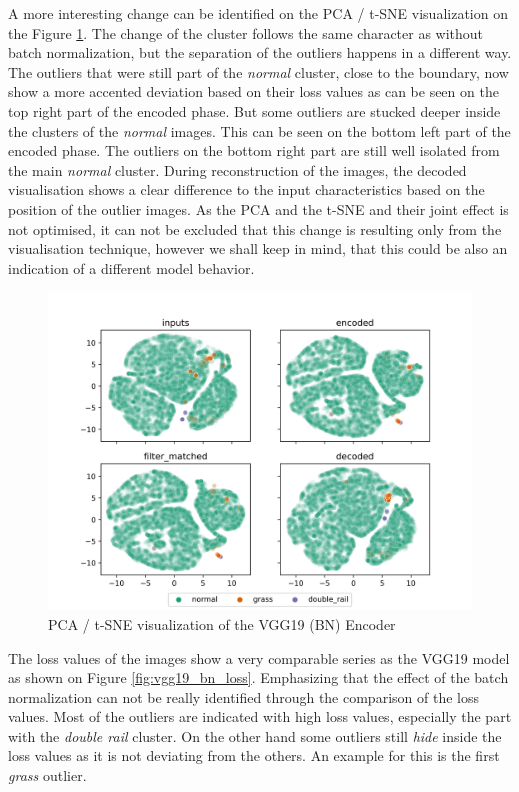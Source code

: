 A more interesting change can be identified on the PCA / t-SNE visualization on the
Figure \ref{fig:vgg19_bn_pca}.
The change of the cluster follows the same character as without batch normalization, but the separation
of the outliers happens in a different way.
The outliers that were still part of the \emph{normal} cluster, close to the boundary, now show a more
accented deviation based on their loss values as can be seen on the top right part of the encoded phase.
But some outliers are stucked deeper inside the clusters of the \emph{normal} images.
This can be seen on the bottom left part of the encoded phase.
The outliers on the bottom right part are still well isolated from the main \emph{normal} cluster.
During reconstruction of the images, the decoded visualisation shows a clear difference to the input
characteristics based on the position of the outlier images.
As the PCA and the t-SNE and their joint effect is not optimised, it can not be excluded that this change
is resulting only from the visualisation technique, however we shall keep in mind, that this could be
also an indication of a different model behavior.

\begin{figure}[!ht]
    \centering
    \includegraphics[width=\textwidth,trim={0 0 0 1cm},clip]{./results/vgg19_bn_vgg19/20230525_045131_feature_vectors_1.png}
    \caption{PCA / t-SNE visualization of the VGG19 (BN) Encoder}
    \label{fig:vgg19_bn_pca}
\end{figure}

The loss values of the images show a very comparable series as the VGG19 model as shown on Figure
\ref{fig:vgg19_bn_loss}.
Emphasizing that the effect of the batch normalization can not be really identified through the
comparison of the loss values.
Most of the outliers are indicated with high loss values, especially the part with the \emph{double rail}
cluster.
On the other hand some outliers still \emph{hide} inside the loss values as it is not deviating from
the others.
An example for this is the first \emph{grass} outlier.

